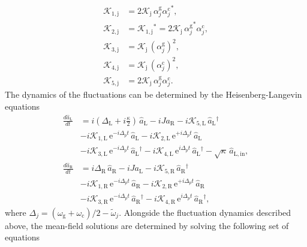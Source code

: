 \documentclass[%
reprint,
floatfix,
superscriptaddress,
amsmath,amssymb,
aps,
pra,
]{revtex4-2}
\newcommand*{\scrpt}[1]{\mathrm{#1}}
\newcommand*{\s}[1]{\ensuremath{_\scrpt{#1}}}
\begin{document}
\begin{subequations}
\label{KK_eff}
\begin{align}
\mathcal{K}\s{1,j} & = 2 \mathcal{K}\s{j} \, \alpha\mathrm{^{g}_\textit{j}}  \alpha\mathrm{^{c}_\textit{j}}^*, \\
\mathcal{K}\s{2,j} & = \mathcal{K}\s{1,j}^* = 2 \mathcal{K}\s{j} \, \alpha\mathrm{^{g}_\textit{j}}^*  \alpha\mathrm{^{c}_\textit{j}}, \\
\mathcal{K}\s{3,j} & =  \mathcal{K}\s{j} \, (\alpha\mathrm{^{g}_\textit{j}})^2, \\
\mathcal{K}\s{4,j} & =  \mathcal{K}\s{j} \, (\alpha\mathrm{^{c}_\textit{j}})^2,\\
\mathcal{K}\s{5,j} & =  2 \mathcal{K}\s{j} \, \alpha\mathrm{^{g}_\textit{j}}  \alpha\mathrm{^{c}_\textit{j}}.
\end{align}
\end{subequations}
%
The dynamics of the fluctuations can be determined by the Heisenberg-Langevin equations 
%
\begin{subequations}
\label{LE_tot}
\begin{align}
\frac{d \hat a\s{L}}{d t} & = i \left( \Delta\s{L} + i \frac{\kappa}{2} \right) \, \hat a\s{L} 
- i J a\s{R}   - i \mathcal{K}\s{5,L} \, \hat{a}\s{L}^\dagger  \label{KK_eff1 }\\
& - i \mathcal{K}\s{1,L} \, \mathrm{e}^{-i \Delta_p t} \, \hat a\s{L} - i \mathcal{K}\s{2,L} \, \mathrm{e}^{+i \Delta_p t} \, \hat a\s{L} \nonumber \\
&- i \mathcal{K}\s{3,L} \, \mathrm{e}^{-i \Delta_p t}  \, \hat{a}\s{L}^\dagger 
 - i \mathcal{K}\s{4,L} \,\mathrm{e}^{i \Delta_p t}  \, \hat{a}\s{L}^\dagger - \sqrt{\kappa} \, \hat{a}\s{L,in}, \nonumber \\
\frac{d \hat a\s{R}}{d t} & = i \Delta\s{R} \, \hat a\s{R} - i Ja\s{L}  - i \mathcal{K}\s{5,R} \, \hat{a}\s{R}^\dagger  \label{KK_eff2 }\\
& - i \mathcal{K}\s{1,R} \, \mathrm{e}^{-i \Delta_p t} \, \hat a\s{R} - i \mathcal{K}\s{2,R} \, \mathrm{e}^{+i \Delta_p t} \, \hat a\s{R} \nonumber \\ 
& - i \mathcal{K}\s{3,R} \, \mathrm{e}^{-i \Delta_p t}  \, \hat{a}\s{R}^\dagger
 - i \mathcal{K}\s{4,R} \,\mathrm{e}^{i \Delta_p t}  \, \hat{a}\s{R}^\dagger, \nonumber
\end{align}
\end{subequations}
%
where $\Delta_{j} =  (\omega\s{g} + \omega\s{c})/2 - \tilde{\omega}_j$. Alongside the fluctuation dynamics described above, the mean-field solutions are determined by solving the following set of equations
\end{document}
